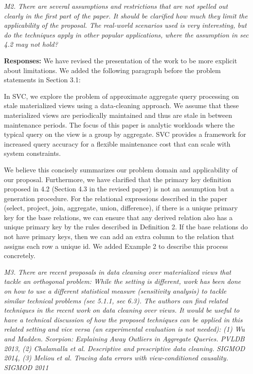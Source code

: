 \vspace{1em}
\emph{M2. There are several assumptions and restrictions that are not spelled out clearly in the first part of the paper. It should be clarified how much they limit the applicability of the proposal. The real-world scenarios used is very interesting, but do the techniques apply in other popular applications, where the assumption in sec 4.2 may not hold?}

\vspace{.25em}

{\bf Responses:} We have revised the presentation of the work to be more explicit about limitations. We added the following paragraph before the problem statements in Section 3.1:
\begin{displayquote}In SVC, we explore the problem of approximate aggregate query
processing on stale materialized views using a data-cleaning approach.
We assume that these materialized views are periodically
maintained and thus are stale in between maintenance periods. The
focus of this paper is analytic workloads where the typical query on the view is a group by aggregate. SVC provides a framework for increased
query accuracy for a flexible maintenance cost that can
scale with system constraints.\end{displayquote}

We believe this concisely summarizes our problem domain and applicability of our proposal. 
Furthermore, we have clarified that the primary key definition proposed in 4.2 
(Section 4.3 in the revised paper) is not an assumption but a generation procedure. For the relational expressions described in the paper (select, project, join, aggregate, union, difference), if there is a unique primary key for the base relations, we can ensure that any derived relation also has a unique primary key by the rules described in Definition 2. If the base relations do not have primary keys, then we can add an extra column to the relation that assigns each row a unique id. We added Example 2 to describe this process concretely.

\vspace{1em}
\emph{M3. There are recent proposals in data cleaning over materialized views that tackle an orthogonal problem: While the setting is different, work has been done on how to use a different statistical measure (sensitivity analysis) to tackle similar technical problems (sec 5.1.1, sec 6.3). The authors can find related techniques in the recent work on data cleaning over views. It would be useful to have a technical discussion of how the proposed techniques can be applied in this related setting and vice versa (an experimental evaluation is not needed): (1) Wu and Madden. Scorpion: Explaining Away Outliers in Aggregate Queries. PVLDB 2013, (2) Chalamalla et al. Descriptive and prescriptive data cleaning. SIGMOD 2014, (3) Meliou et al. Tracing data errors with view-conditioned causality. SIGMOD 2011}

